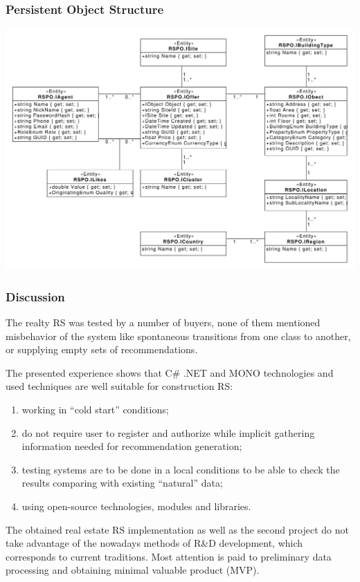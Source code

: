 \documentclass[10pt,dvipsnames]{beamer}
\begin{document}
\begin{frame}
  \frametitle{Persistent Object Structure}
   \centering
   \includegraphics[width=1\linewidth]{class_diagram.pdf}

\end{frame}

\begin{frame}
  \frametitle{Discussion}
  The realty RS was tested by a number of buyers, none of them mentioned misbehavior of the system like spontaneous transitions from one class to another, or supplying empty sets of recommendations.

The presented experience shows that C\# .NET and MONO technologies and used techniques are well suitable for construction RS:
\begin{enumerate}
\item working in ``cold start'' conditions;
\item do not require user to register and authorize while implicit gathering information needed for recommendation generation;
\item testing systems are to be done in a local conditions to be able to check the results comparing with existing ``natural'' data;
\item using open-source technologies, modules and libraries.
\end{enumerate}

The obtained real estate RS implementation as well as the second project do not take advantage of the nowadays methods of R\&D development, which corresponds to current traditions.  Most attention is paid to preliminary data processing and obtaining minimal valuable product (MVP).
\end{frame}
\end{document}
